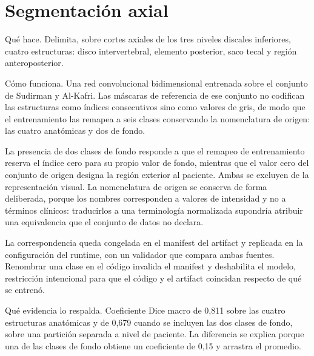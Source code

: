 \section{Segmentación axial}

Qué hace. Delimita, sobre cortes axiales de los tres niveles discales inferiores, cuatro estructuras: disco intervertebral, elemento posterior, saco tecal y región anteroposterior.

Cómo funciona. Una red convolucional bidimensional entrenada sobre el conjunto de Sudirman y Al-Kafri. Las máscaras de referencia de ese conjunto no codifican las estructuras como índices consecutivos sino como valores de gris, de modo que el entrenamiento las remapea a seis clases conservando la nomenclatura de origen: las cuatro anatómicas y dos de fondo.


La presencia de dos clases de fondo responde a que el remapeo de entrenamiento reserva el índice cero para su propio valor de fondo, mientras que el valor cero del conjunto de origen designa la región exterior al paciente. Ambas se excluyen de la representación visual. La nomenclatura de origen se conserva de forma deliberada, porque los nombres corresponden a valores de intensidad y no a términos clínicos: traducirlos a una terminología normalizada supondría atribuir una equivalencia que el conjunto de datos no declara.

La correspondencia queda congelada en el manifest del artifact y replicada en la configuración del runtime, con un validador que compara ambas fuentes. Renombrar una clase en el código invalida el manifest y deshabilita el modelo, restricción intencional para que el código y el artifact coincidan respecto de qué se entrenó.


Qué evidencia lo respalda. Coeficiente Dice macro de 0,811 sobre las cuatro estructuras anatómicas y de 0,679 cuando se incluyen las dos clases de fondo, sobre una partición separada a nivel de paciente. La diferencia se explica porque una de las clases de fondo obtiene un coeficiente de 0,15 y arrastra el promedio.

